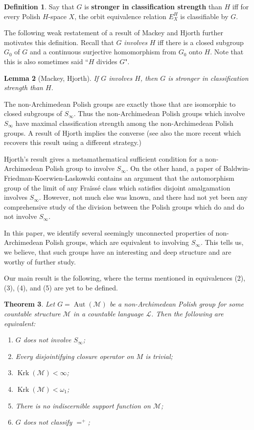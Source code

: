 \documentclass[12pt]{amsart}
\theoremstyle{plain}
\newtheorem{theorem}{Theorem}[section]
\newtheorem{lemma}[theorem]{Lemma}
\theoremstyle{definition}
\newtheorem{definition}[theorem]{Definition}
\newcommand{\mcL}{\mathcal{L}}
\newcommand{\mcM}{\mathcal{M}}
\DeclareMathOperator{\Aut}{Aut}
\DeclareMathOperator{\Krk}{Krk}
\begin{document}
\begin{definition}
    Say that $G$ is \textbf{stronger in classification strength} than $H$ iff for every Polish $H$-space $X$, the orbit equivalence relation $E^H_X$ is classifiable by $G$.
\end{definition}

The following weak restatement of a result of Mackey and Hjorth further motivates this definition.
Recall that $G$ \emph{involves} $H$ iff there is a closed subgroup $G_0$ of $G$ and a continuous surjective homomorphism from $G_0$ onto $H$. Note that this is also sometimes said ``$H$ divides $G$".

\begin{lemma}[Mackey, Hjorth]\label{lem:mackey}
    If $G$ involves $H$, then $G$ is stronger in classification strength than $H$.
\end{lemma}

The non-Archimedean Polish groups are exactly those that are isomorphic to closed subgroups of $S_\infty$.
Thus the non-Archimedean Polish groups which involve $S_\infty$ have maximal classification strength among the non-Archimedean Polish groups.
A result of Hjorth implies the converse \cite{Hjorth2001} (see also the more recent \cite{LU2021} which recovers this result using a different strategy.)

Hjorth's result gives a metamathematical sufficient condition for a non-Archimedean Polish group to involve $S_\infty$.
On the other hand, a paper of Baldwin-Friedman-Koerwien-Laskowski contains an argument that the automorphism group of the limit of any Fra\"{i}ss\'{e} class which satisfies disjoint amalgamation involves $S_\infty$.
However, not much else was known, and there had not yet been any comprehensive study of the division between the Polish groups which do and do not involve $S_\infty$.

In this paper, we identify several seemingly unconnected properties of non-Archimedean Polish groups, which are equivalent to involving $S_\infty$.
This tells us, we believe, that such groups have an interesting and deep structure and are worthy of further study.

Our main result is the following, where the terms mentioned in equivalences (2), (3), (4), and (5) are yet to be defined.

\begin{theorem}
Let $G = \Aut(\mcM)$ be a non-Archimedean Polish group for some countable structure $\mcM$ in a countable language $\mcL$. Then the following are equivalent:
\begin{enumerate}
    \item $G$ does not involve $S_\infty$;
    \item Every disjointifying closure operator on $M$ is trivial;
    \item $\Krk(\mcM) < \infty$;
    \item $\Krk(\mcM) < \omega_1$;
    \item There is no indiscernible support function on $\mcM$;
    \item $G$ does not classify $=^+$;
\end{enumerate}
\end{theorem}
\end{document}

